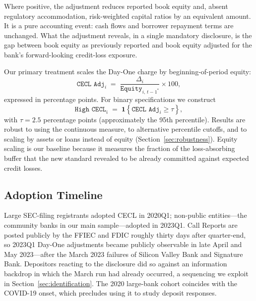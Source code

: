 Where positive, the adjustment reduces reported book equity and, absent
regulatory accommodation, risk-weighted capital ratios by an equivalent
amount.  It is a pure accounting event: cash flows and borrower repayment
terms are unchanged.  What the adjustment reveals, in a single mandatory
disclosure, is the gap between book equity as previously reported and book
equity adjusted for the bank's forward-looking credit-loss exposure.

Our primary treatment scales the Day-One charge by beginning-of-period
equity:
\begin{equation}
  \texttt{CECL Adj}_{i}
  \;=\;
  \frac{\Delta_i}{\texttt{Equity}_{i,\,t-1^{*}}}
  \times 100,
  \label{eq:treatment}
\end{equation}
expressed in percentage points.  For binary specifications we construct
\begin{equation}
  \texttt{High CECL}_{i}
  \;=\;
  \mathbf{1}\!\left\{
    \texttt{CECL Adj}_{i} \geq \tau
  \right\},
  \label{eq:binary}
\end{equation}
with $\tau = 2.5$ percentage points (approximately the 95th percentile).
Results are robust to using the continuous measure, to alternative
percentile cutoffs, and to scaling by assets or loans instead of equity
(Section~\ref{sec:robustness}).  Equity scaling is our baseline because it
measures the fraction of the loss-absorbing buffer that the new standard
revealed to be already committed against expected credit losses.

\subsection{Adoption Timeline}
\label{sec:background:timeline}

Large SEC-filing registrants adopted CECL in 2020Q1; non-public
entities---the community banks in our main sample---adopted in 2023Q1.
Call Reports are posted publicly by the FFIEC and FDIC roughly thirty
days after quarter-end, so 2023Q1 Day-One adjustments became publicly
observable in late April and May 2023---after the March 2023 failures of
Silicon Valley Bank and Signature Bank.  Depositors reacting to the
disclosure did so against an information backdrop in which the March run
had already occurred, a sequencing we exploit in
Section~\ref{sec:identification}.  The 2020 large-bank cohort coincides
with the COVID-19 onset, which precludes using it to study deposit
responses.
